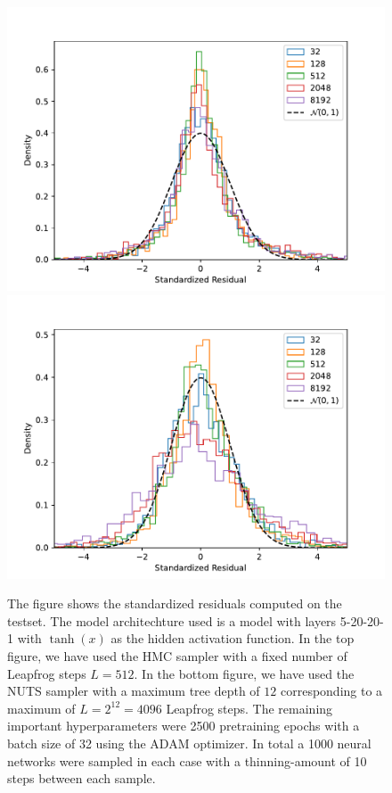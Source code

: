 \begin{figure}[h!]
    \centering
    \includegraphics[scale=0.7]{figures/standardized_residuals/effect_of_burnin/standardized_residuals_hmc_vs_burn_in_steps.pdf}
    \includegraphics[scale=0.7]{figures/standardized_residuals/effect_of_burnin/standardized_residuals_nuts_vs_burn_in_steps.pdf}
    \caption{The figure shows the standardized residuals computed on the testset. The model architechture used is a model with layers 5-20-20-1 with $\tanh(x)$ as the hidden activation function. In the top figure, we have used the HMC sampler with a fixed number of Leapfrog steps $L = 512$. In the bottom figure, we have used the NUTS sampler with a maximum tree depth of $12$ corresponding to a maximum of $L = 2^{12} = 4096$ Leapfrog steps. The remaining important hyperparameters were 2500 pretraining epochs with a batch size of 32 using the ADAM optimizer. In total a 1000 neural networks were sampled in each case with a thinning-amount of 10 steps between each sample.
    }
    \label{fig:standardized_residuals_vs_burn_in_steps}
\end{figure}


